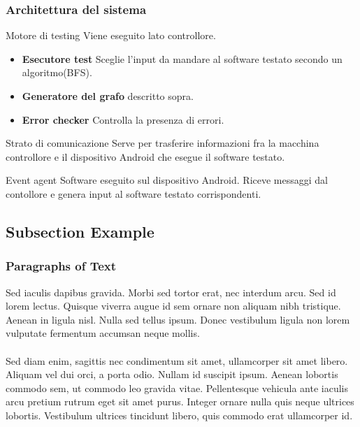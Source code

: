 \documentclass[12pt]{beamer}
\begin{document}
\begin{frame}
    \frametitle{Architettura del sistema}
    \begin{block}{Motore di testing}
        Viene eseguito lato controllore.
        \begin{itemize}
            \item \textbf{Esecutore test} Sceglie l'input da mandare al software testato secondo un algoritmo(BFS).
            \item \textbf{Generatore del grafo} descritto sopra.
            \item \textbf{Error checker} Controlla la presenza di errori.
        \end{itemize}
    \end{block}
    \begin{block}{Strato di comunicazione}
        Serve per trasferire informazioni fra la macchina controllore e il dispositivo Android che esegue il software testato.
    \end{block}
    \begin{block}{Event agent}
        Software eseguito sul dispositivo Android. Riceve messaggi dal contollore e genera input al software testato corrispondenti.
    \end{block}
\end{frame}


\subsection{Subsection Example} %

\begin{frame}
\frametitle{Paragraphs of Text}
Sed iaculis dapibus gravida. Morbi sed tortor erat, nec interdum arcu. Sed id lorem lectus. Quisque viverra augue id sem ornare non aliquam nibh tristique. Aenean in ligula nisl. Nulla sed tellus ipsum. Donec vestibulum ligula non lorem vulputate fermentum accumsan neque mollis.\\~\\

Sed diam enim, sagittis nec condimentum sit amet, ullamcorper sit amet libero. Aliquam vel dui orci, a porta odio. Nullam id suscipit ipsum. Aenean lobortis commodo sem, ut commodo leo gravida vitae. Pellentesque vehicula ante iaculis arcu pretium rutrum eget sit amet purus. Integer ornare nulla quis neque ultrices lobortis. Vestibulum ultrices tincidunt libero, quis commodo erat ullamcorper id.
\end{frame}
\end{document}
